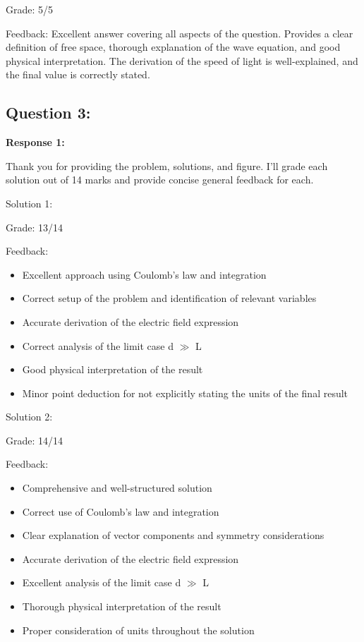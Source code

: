\documentclass[a4paper,11pt]{article}
\begin{document}
Grade: 5/5

Feedback: Excellent answer covering all aspects of the question. Provides a clear definition of free space, thorough explanation of the wave equation, and good physical interpretation. The derivation of the speed of light is well-explained, and the final value is correctly stated.

\subsection*{Question 3:}

\textbf{Response 1:}

Thank you for providing the problem, solutions, and figure. I'll grade each solution out of 14 marks and provide concise general feedback for each.

Solution 1:

Grade: 13/14

Feedback:
\begin{itemize}
\item Excellent approach using Coulomb's law and integration
\item Correct setup of the problem and identification of relevant variables
\item Accurate derivation of the electric field expression
\item Correct analysis of the limit case d $\gg$ L
\item Good physical interpretation of the result
\item Minor point deduction for not explicitly stating the units of the final result
\end{itemize}

Solution 2:

Grade: 14/14

Feedback:
\begin{itemize}
\item Comprehensive and well-structured solution
\item Correct use of Coulomb's law and integration
\item Clear explanation of vector components and symmetry considerations
\item Accurate derivation of the electric field expression
\item Excellent analysis of the limit case d $\gg$ L
\item Thorough physical interpretation of the result
\item Proper consideration of units throughout the solution
\end{itemize}
\end{document}
